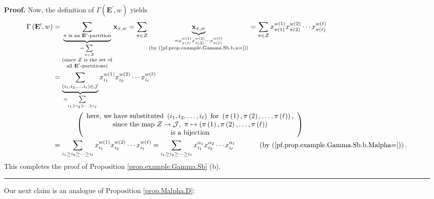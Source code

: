 \documentclass[numbers=enddot,12pt,final,onecolumn,notitlepage,abstracton]{scrartcl}
\theoremstyle{definition}
\newenvironment{proof}[1][Proof]{\noindent\textbf{#1.} }{\ \rule{0.5em}{0.5em}}
\let\sumnonlimits\sum
\renewcommand{\sum}{\sumnonlimits\limits}
\newenvironment{verlong}{}{}
\begin{document}
\begin{verlong}
\begin{footnotesize}
\begin{proof}
Now, the definition of $\Gamma\left(  \mathbf{E}^{\prime},w\right)  $ yields%
\begin{align*}
\Gamma\left(  {\mathbf{E}}^{\prime},w\right)   &  =\underbrace{\sum_{\pi\text{
is an }{\mathbf{E}}^{\prime}\text{-partition}}}_{\substack{=\sum_{\pi\in
Z}\\\text{(since }Z\text{ is the set of}\\\text{all }\mathbf{E}^{\prime
}\text{-partitions)}}}{\mathbf{x}}_{\pi,w}=\sum_{\pi\in Z}%
\underbrace{{\mathbf{x}}_{\pi,w}}_{\substack{=x_{\pi\left(  1\right)
}^{w\left(  1\right)  }x_{\pi\left(  2\right)  }^{w\left(  2\right)  }\cdots
x_{\pi\left(  \ell\right)  }^{w\left(  \ell\right)  }\\\text{(by
(\ref{pf.prop.example.Gamma.Sb.b.x=}))}}}=\sum_{\pi\in Z}x_{\pi\left(
1\right)  }^{w\left(  1\right)  }x_{\pi\left(  2\right)  }^{w\left(  2\right)
}\cdots x_{\pi\left(  \ell\right)  }^{w\left(  \ell\right)  }\\
&  =\underbrace{\sum_{\left(  i_{1},i_{2},\ldots,i_{\ell}\right)
\in\mathcal{J}}}_{=\sum_{i_{1}\geq i_{2}\geq\cdots\geq i_{\ell}}}x_{i_{1}%
}^{w\left(  1\right)  }x_{i_{2}}^{w\left(  2\right)  }\cdots x_{i_{\ell}%
}^{w\left(  \ell\right)  }\\
&  \ \ \ \ \ \ \ \ \ \ \left(
\begin{array}
[c]{c}%
\text{here, we have substituted }\left(  i_{1},i_{2},\ldots,i_{\ell}\right)
\text{ for }\left(  \pi\left(  1\right)  ,\pi\left(  2\right)  ,\ldots
,\pi\left(  \ell\right)  \right)  \text{,}\\
\text{since the map }Z\rightarrow\mathcal{J},\ \pi\mapsto\left(  \pi\left(
1\right)  ,\pi\left(  2\right)  ,\ldots,\pi\left(  \ell\right)  \right) \\
\text{is a bijection}%
\end{array}
\right) \\
&  =\sum_{i_{1}\geq i_{2}\geq\cdots\geq i_{\ell}}x_{i_{1}}^{w\left(  1\right)
}x_{i_{2}}^{w\left(  2\right)  }\cdots x_{i_{\ell}}^{w\left(  \ell\right)
}=\sum_{i_{1}\geq i_{2}\geq\cdots\geq i_{\ell}}x_{i_{1}}^{\alpha_{1}}x_{i_{2}%
}^{\alpha_{2}}\cdots x_{i_{\ell}}^{\alpha_{\ell}}\ \ \ \ \ \ \ \ \ \ \left(
\text{by (\ref{pf.prop.example.Gamma.Sb.b.Malpha=})}\right)  .
\end{align*}
This completes the proof of Proposition \ref{prop.example.Gamma.Sb} (b).
\end{proof}

Our next claim is an analogue of Proposition \ref{prop.Malpha.D}:


\end{footnotesize}
\end{verlong}
\end{document}
